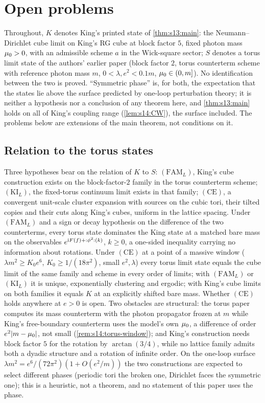 \section{Open problems}\label{sec:s23}

Throughout, $K$ denotes King's printed state of \cref{thm:s13:main}: the Neumann--Dirichlet cube limit on King's RG cube at block factor $5$, fixed photon mass $\mu_0>0$, with an admissible scheme $a$ in the Wick-square sector; $S$ denotes a torus limit state of the authors' earlier paper \cite{SymPhase} (block factor $2$, torus counterterm scheme with reference photon mass $m$, $0<\lambda,e^2<0.1m$, $\mu_0\in(0,m]$). No identification between the two is proved. ``Symmetric phase'' is, for both, the expectation that the states lie above the surface predicted by one-loop perturbation theory; it is neither a hypothesis nor a conclusion of any theorem here, and \cref{thm:s13:main} holds on all of King's coupling range (\cref{lem:s14:CW}), the surface included. The problems below are extensions of the main theorem, not conditions on it.

\subsection{Relation to the torus states}

Three hypotheses bear on the relation of $K$ to $S$: $(\mathrm{FAM}_L)$, King's cube construction exists on the block-factor-$2$ family in the torus counterterm scheme; $(\mathrm{KI}_L)$, the fixed-torus continuum limit exists in that family; $(\mathrm{CE})$, a convergent unit-scale cluster expansion with sources on the cubic tori, their tilted copies and their cuts along King's cubes, uniform in the lattice spacing. Under $(\mathrm{FAM}_L)$ and a sign or decay hypothesis on the difference of the two counterterms, every torus state dominates the King state at a matched bare mass on the observables $e^{\mathrm iF(f)+{:}\phi^2{:}(k)}$, $k\ge0$, a one-sided inequality carrying no information about rotations. Under $(\mathrm{CE})$ at a point of a massive window ($\lambda m^2\ge K_0e^6$, $K_0\ge1/(18\pi^2)$, small $e^2,\lambda$) every torus limit state equals the cube limit of the same family and scheme in every order of limits; with $(\mathrm{FAM}_L)$ or $(\mathrm{KI}_L)$ it is unique, exponentially clustering and ergodic; with King's cube limits on both families it equals $K$ at an explicitly shifted bare mass. Whether $(\mathrm{CE})$ holds anywhere at $e>0$ is open. Two obstacles are structural: the torus paper computes its mass counterterm with the photon propagator frozen at $m$ while King's free-boundary counterterm uses the model's own $\mu_0$, a difference of order $e^2|m-\mu_0|$, not small (\cref{rem:s14:torus-window}); and King's construction needs block factor $5$ for the rotation by $\arctan(3/4)$, while no lattice family admits both a dyadic structure and a rotation of infinite order. On the one-loop surface $\lambda m^2=e^6/(72\pi^2)(1+O(e^2/m))$ the two constructions are expected to select different phases (periodic tori the broken one, Dirichlet faces the symmetric one); this is a heuristic, not a theorem, and no statement of this paper uses the phase.

